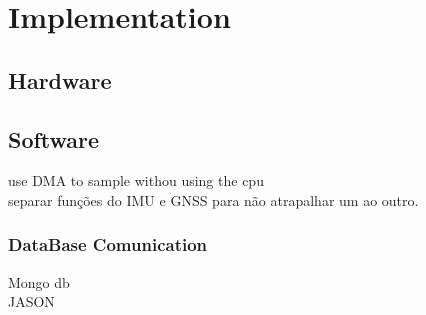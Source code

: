 \chapter{Implementation}
\section{Hardware}

\section{Software}

use DMA to sample withou using the cpu\\
separar funções do IMU e GNSS para não atrapalhar um ao outro.\\
\subsection{DataBase Comunication}
Mongo db \\
JASON